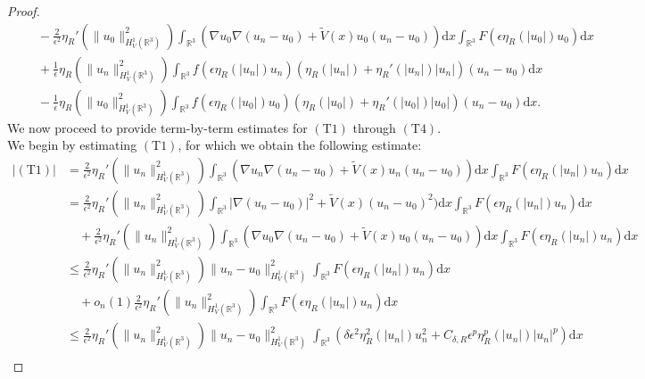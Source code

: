 \documentclass[10pt,a4paper]{amsart}
\begin{document}
\begin{proof}
\begin{align}
     &\quad~- \frac{2}{\epsilon^2} \eta_R'(\|u_0\|_{H^1_{V}(\mathbb{R}^3)}^2) \int_{\mathbb{R}^3}(\nabla u_0\nabla (u_{n}-u_{0})+\tilde V(x)u_0(u_{n}-u_{0})) \text{d}x \int_{\mathbb{R}^3} F(\epsilon \eta_R(|u_0|) u_0)  \text{d}x \tag{T2} \\
    &\quad~+ \frac{1}{\epsilon} \eta_R(\|u_n\|_{H^1_{V}(\mathbb{R}^3)}^2) \int_{\mathbb{R}^3} f(\epsilon\eta_R(|u_n|) u_n) \left(\eta_R(|u_n|) + \eta_R'(|u_n|)|u_n| \right) (u_n-u_0) \text{d}x  \tag{T3}\\
    &\quad~- \frac{1}{\epsilon} \eta_R(\|u_0\|_{H^1_{V}(\mathbb{R}^3)}^2) \int_{\mathbb{R}^3} f(\epsilon \eta_R(|u_0|) u_0) \left(\eta_R(|u_0|) + \eta_R'(|u_0|)|u_0| \right) (u_n-u_0) \text{d}x. \tag{T4}
\end{align}
We now proceed to provide term-by-term estimates for $(\text{T}1)$ through $(\text{T}4)$. We begin by estimating $(\text{T}1)$, for which we obtain the following estimate:
\begin{equation*}
    \begin{aligned}
       \left | (\text{T}1)\right |&=\frac{2}{\epsilon^2} \eta_R'(\|u_n\|_{H^1_{V}(\mathbb{R}^3)}^2) \int_{\mathbb{R}^3}(\nabla u_n\nabla (u_{n}-u_{0})+\tilde V(x)u_n(u_{n}-u_{0})) \text{d}x \int_{\mathbb{R}^3} F(\epsilon \eta_R(|u_n|) u_n) \text{d}x\\
       &=\frac{2}{\epsilon^2} \eta_R'(\|u_n\|_{H^1_{V}(\mathbb{R}^3)}^2) \int_{\mathbb{R}^3}|\nabla (u_n-u_0)|^2+\tilde V(x)(u_{n}-u_{0})^2) \text{d}x \int_{\mathbb{R}^3} F(\epsilon \eta_R(|u_n|) u_n) \text{d}x\\
       &\quad+\frac{2}{\epsilon^2} \eta_R'(\|u_n\|_{H^1_{V}(\mathbb{R}^3)}^2) \int_{\mathbb{R}^3}(\nabla u_0\nabla (u_{n}-u_{0})+\tilde V(x)u_0(u_{n}-u_{0})) \text{d}x \int_{\mathbb{R}^3} F(\epsilon \eta_R(|u_n|) u_n) \text{d}x\\
       &\leq  \frac{2}{\epsilon^2} \eta_R'(\|u_n\|_{H^1_{V}(\mathbb{R}^3)}^2)\|u_n-u_0\|^2_{H^{1}_{V}(\mathbb{R}^3)}\int_{\mathbb{R}^3} F(\epsilon \eta_R(|u_n|) u_n)  \text{d}x\\
       &\quad+o_n(1)\frac{2}{\epsilon^2} \eta_R'(\|u_n\|_{H^1_{V}(\mathbb{R}^3)}^2)\int_{\mathbb{R}^3} F(\epsilon \eta_R(|u_n|) u_n) \text{d}x\\
      & \leq \frac{2}{\epsilon^2} \eta_R'(\|u_n\|_{H^1_{V}(\mathbb{R}^3)}^2) \|u_n-u_0\|^2_{H^{1}_{V}(\mathbb{R}^3)}\int_{\mathbb{R}^{3}}\left ( \delta \epsilon ^{2} \eta _{R}^{2}\left ( \left | u_n\right | \right )u_n^{2}+C_{\delta,R}\epsilon ^{p}\eta _{R}^{p}\left ( \left | u_n\right | \right )\left | u_n\right |^{p}\right )\text{d}x\\

\end{aligned}
\end{equation*}
\end{proof}
\end{document}
